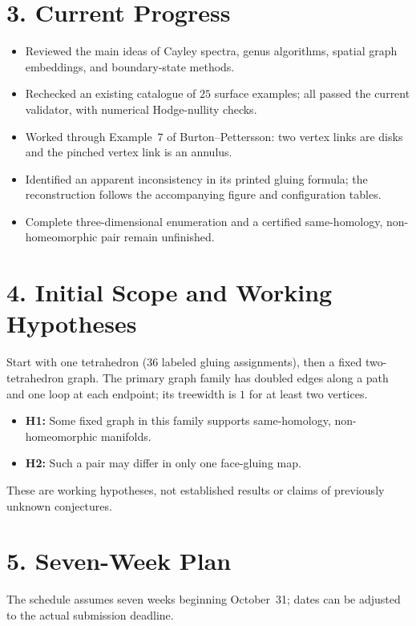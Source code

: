 \documentclass[11pt,a4paper]{article}
\begin{document}
\section*{3. Current Progress}
\begin{itemize}
\item Reviewed the main ideas of Cayley spectra, genus algorithms, spatial graph embeddings, and boundary-state methods.
\item Rechecked an existing catalogue of $25$ surface examples; all passed the current validator, with numerical Hodge-nullity checks.
\item Worked through Example~7 of Burton--Pettersson: two vertex links are disks and the pinched vertex link is an annulus.
\item Identified an apparent inconsistency in its printed gluing formula; the reconstruction follows the accompanying figure and configuration tables.
\item Complete three-dimensional enumeration and a certified same-homology, non-homeomorphic pair remain unfinished.
\end{itemize}

\section*{4. Initial Scope and Working Hypotheses}
Start with one tetrahedron ($36$ labeled gluing assignments), then a fixed two-tetrahedron graph. The primary graph family has doubled edges along a path and one loop at each endpoint; its treewidth is $1$ for at least two vertices.
\begin{itemize}
\item \textbf{H1:} Some fixed graph in this family supports same-homology, non-homeomorphic manifolds.
\item \textbf{H2:} Such a pair may differ in only one face-gluing map.
\end{itemize}
These are working hypotheses, not established results or claims of previously unknown conjectures.

\newpage
\section*{5. Seven-Week Plan}
The schedule assumes seven weeks beginning October~31; dates can be adjusted to the actual submission deadline.
\end{document}
